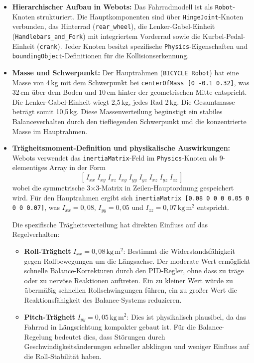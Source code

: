   
  \begin{itemize}
    \item \textbf{Hierarchischer Aufbau in Webots:} Das Fahrradmodell ist als \texttt{Robot}-Knoten strukturiert. 
    Die Hauptkomponenten sind über \texttt{HingeJoint}-Knoten verbunden, das Hinterrad (\texttt{rear\_wheel}), die Lenker-Gabel-Einheit 
    (\texttt{Handlebars\_and\_Fork}) mit integriertem Vorderrad sowie die Kurbel-Pedal-Einheit (\texttt{crank}). Jeder Knoten besitzt 
    spezifische \texttt{Physics}-Eigenschaften und \texttt{boundingObject}-Definitionen für die Kollisionserkennung.
    
    \item \textbf{Masse und Schwerpunkt:} Der Hauptrahmen (\texttt{BICYCLE Robot}) hat eine Masse von 4\,kg mit dem Schwerpunkt bei 
    \texttt{centerOfMass [0 -0.1 0.32]}, was 32\,cm über dem Boden und 10\,cm hinter der geometrischen Mitte entspricht. Die Lenker-Gabel-Einheit 
    wiegt 2{,}5\,kg, jedes Rad 2\,kg. Die Gesamtmasse beträgt somit 10{,}5\,kg. Diese Massenverteilung begünstigt ein stabiles Balanceverhalten 
    durch den tiefliegenden Schwerpunkt und die konzentrierte Masse im Hauptrahmen.
    
    \item \textbf{Trägheitsmoment-Definition und physikalische Auswirkungen:} Webots verwendet das \texttt{inertiaMatrix}-Feld im \texttt{Physics}-Knoten als 9-elementiges Array in der Form
    \[
      [\,I_{xx}\; I_{xy}\; I_{xz}\; I_{xy}\; I_{yy}\; I_{yz}\; I_{xz}\; I_{yz}\; I_{zz}\,]
    \]
    wobei die symmetrische 3$\times$3-Matrix in Zeilen-Hauptordnung gespeichert wird. Für den Hauptrahmen ergibt sich 
    \texttt{inertiaMatrix [0.08 0 0 0 0.05 0 0 0 0.07]}, was \(I_{xx}=0{,}08\), \(I_{yy}=0{,}05\) und \(I_{zz}=0{,}07\,\mathrm{kg\,m^{2}}\) 
    entspricht.

    Die spezifische Trägheitsverteilung hat direkten Einfluss auf das Regelverhalten:
    \begin{itemize}
      \item \textbf{Roll-Trägheit} \(I_{xx}=0{,}08\,\mathrm{kg\,m^{2}}\): Bestimmt die Widerstandsfähigkeit gegen Rollbewegungen um die Längsachse. 
      Der moderate Wert ermöglicht schnelle Balance-Korrekturen durch den PID-Regler, ohne dass zu träge oder zu nervöse Reaktionen auftreten. 
      Ein zu kleiner Wert würde zu übermäßig schnellen Rollschwingungen führen, ein zu großer Wert die Reaktionsfähigkeit des Balance-Systems reduzieren.
      
      \item \textbf{Pitch-Trägheit} \(I_{yy}=0{,}05\,\mathrm{kg\,m^{2}}\): Dies ist physikalisch plausibel, da das Fahrrad in Längsrichtung kompakter gebaut ist. 
      Für die Balance-Regelung bedeutet dies, dass Störungen durch Geschwindigkeitsänderungen schneller abklingen und weniger Einfluss auf 
      die Roll-Stabilität haben.
      

\end{itemize}
\end{itemize}
